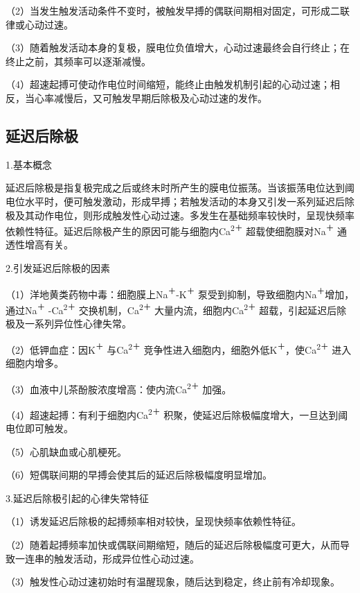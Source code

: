 （2）当发生触发活动条件不变时，被触发早搏的偶联间期相对固定，可形成二联律或心动过速。

（3）随着触发活动本身的复极，膜电位负值增大，心动过速最终会自行终止；在终止之前，其频率可以逐渐减慢。

（4）超速起搏可使动作电位时间缩短，能终止由触发机制引起的心动过速；相反，当心率减慢后，又可触发早期后除极及心动过速的发作。

\protect\hypertarget{text00024.htmlux5cux23subid304}{}{}

\subsection{延迟后除极}

1.基本概念

延迟后除极是指复极完成之后或终末时所产生的膜电位振荡。当该振荡电位达到阈电位水平时，便可触发激动，形成早搏；若触发活动的本身又引发一系列延迟后除极及其动作电位，则形成触发性心动过速。多发生在基础频率较快时，呈现快频率依赖性特征。延迟后除极产生的原因可能与细胞内Ca\textsuperscript{2＋}
超载使细胞膜对Na\textsuperscript{＋} 通透性增高有关。

2.引发延迟后除极的因素

（1）洋地黄类药物中毒：细胞膜上Na\textsuperscript{＋}-K\textsuperscript{＋} 泵受到抑制，导致细胞内Na\textsuperscript{＋}增加，通过Na\textsuperscript{＋} -Ca\textsuperscript{2＋}
交换机制，Ca\textsuperscript{2＋}
大量内流，细胞内Ca\textsuperscript{2＋}
超载，引起延迟后除极及一系列异位性心律失常。

（2）低钾血症：因K\textsuperscript{＋} 与Ca\textsuperscript{2＋}
竞争性进入细胞内，细胞外低K\textsuperscript{＋}，使Ca\textsuperscript{2＋} 进入细胞内增多。

（3）血液中儿茶酚胺浓度增高：使内流Ca\textsuperscript{2＋} 加强。

（4）超速起搏：有利于细胞内Ca\textsuperscript{2＋}
积聚，使延迟后除极幅度增大，一旦达到阈电位即可触发。

（5）心肌缺血或心肌梗死。

（6）短偶联间期的早搏会使其后的延迟后除极幅度明显增加。

3.延迟后除极引起的心律失常特征

（1）诱发延迟后除极的起搏频率相对较快，呈现快频率依赖性特征。

（2）随着起搏频率加快或偶联间期缩短，随后的延迟后除极幅度可更大，从而导致一连串的触发活动，形成异位性心动过速。

（3）触发性心动过速初始时有温醒现象，随后达到稳定，终止前有冷却现象。

